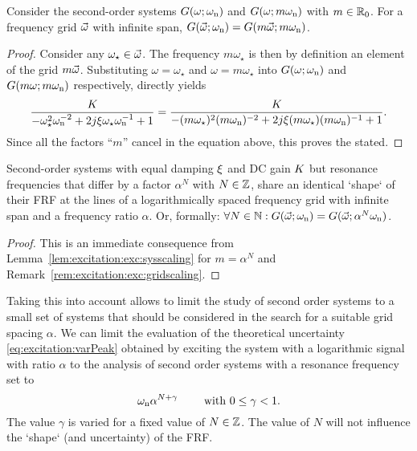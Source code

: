   \begin{lemma} \label{lem:excitation:exc:sysscaling}
  Consider the second-order systems $G(\omega; \omega_{\mathrm{n}})$ and $G(\omega; m\omega_{\mathrm{n}})$ with $m \in {\ensuremath{\mathbb{R}}}_{0}$. 
  For a frequency grid $\vec{\omega}$ with infinite span, $G(\vec{\omega}; \omega_{\mathrm{n}}) = G(m \vec{\omega}; m\omega_{\mathrm{n}})$.
  \end{lemma}
  \begin{proof}
  Consider any $\omega_{\star} \in \vec{\omega}$. The frequency $m\omega_{\star}$ is then by definition an element of the grid $m\vec{\omega}$.
  Substituting $\omega = \omega_{\star}$ and $\omega = m \omega_{\star}$  into  $G(\omega; \omega_{\mathrm{n}})$ and $G(m\omega; m\omega_{\mathrm{n}})$  respectively, directly yields
  \begin{equation}
    \frac{K_{}}{- \omega_{\star}^2 \omega_{\mathrm{n}}^{-2} + 2j\xi_{} \omega_{\star} \omega_{\mathrm{n}}^{-1} + 1} = 
    \frac{K_{}}{- (m\omega_{\star})^2 (m\omega_{\mathrm{n}})^{-2} + 2j\xi_{} (m\omega_{\star}) (m\omega_{\mathrm{n}})^{-1} + 1}
    \text{.}
  \end{equation}
  Since all the factors ``$m$'' cancel in the equation above, this proves the stated.
  \end{proof}

  \begin{theorem}
    Second-order  systems with equal damping $\xi_{}$ and \gls{DC} gain $K_{}$ but resonance frequencies that differ by a factor $\alpha^N$ with $N \in \mathbb{Z}$, share an identical `shape` of their \gls{FRF} at the lines of a logarithmically spaced frequency grid with infinite span and a frequency ratio $\alpha$.
    Or, formally: $\forall N \in \mathbb{N}: G(\vec{\omega};\omega_{\mathrm{n}}) = G(\vec{\omega}; \alpha^{N}\omega_{\mathrm{n}})$.
  \end{theorem}
  \begin{proof}
    This is an immediate consequence from Lemma~\ref{lem:excitation:exc:sysscaling} for $m= \alpha^{N}$ and Remark~\ref{rem:excitation:exc:gridscaling}.
  \end{proof}

  Taking this into account allows to limit the study of second order systems to a small set of systems that should be considered in the search for a suitable grid spacing $\alpha$.
  We can limit the evaluation of the theoretical uncertainty \eqref{eq:excitation:varPeak} obtained by exciting the system with a logarithmic signal with ratio $\alpha$ to the analysis of second order systems with a resonance frequency set to
  \begin{equation}
    \omega_{\mathrm{n}} \alpha^{N+\gamma}\qquad \text{ with } 0 \leq \gamma < 1\text{.}
    \label{eq:excitation:theoreticalBestVariationOmega}
  \end{equation}
  The value $\gamma$ is varied for a fixed value of $N \in \mathbb{Z}$.
  The value of $N$ will not influence the `shape` (and uncertainty) of the \gls{FRF}.

